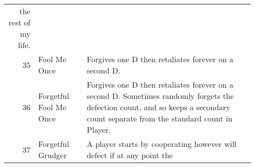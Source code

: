 \begin{table}[H]
\begin{adjustbox}{height=0.8\textwidth, width=1.1\textwidth}
\begin{tabular}{rlll}
	the rest of my life.                                                                                                                                                                                                                                                                                                                                                                                                                                                                                                                                                                                                                                                                                                                                                                                                                                                                                                                        \\
	35   & Fool Me Once                & Forgives one D then retaliates forever on a second D.                                                                             \\
	36   & Forgetful Fool Me Once      & Forgives one D then retaliates forever on a second D. Sometimes randomly
	forgets the defection count, and so keeps a secondary count separate from
	the standard count in Player.                                                                                                                                                                                                                                                                                                                                                                                                                                                                                                                                                                                                                                                                                                                                                                                                                                 \\
	37   & Forgetful Grudger           & A player starts by cooperating however will defect if at any point the

\end{tabular}
\end{adjustbox}
\end{table}
